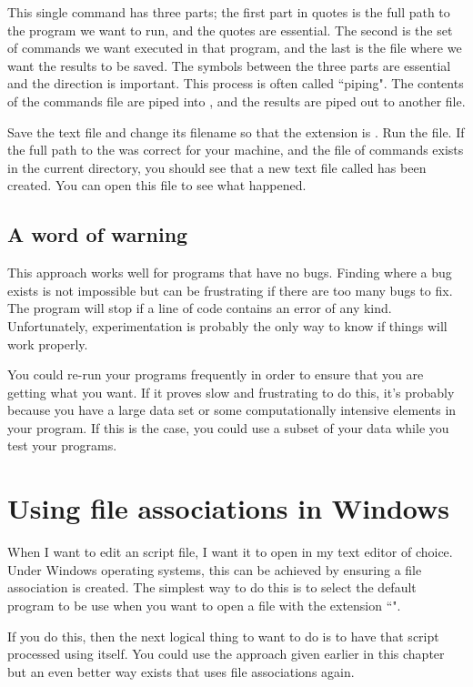 This single command has three parts; the first part in quotes is the full path to the program we want to run, and the quotes are essential. The second is the set of commands we want executed in that program, and the last is the file where we want the results to be saved. The symbols between the three parts are essential and the direction is important. This process is often called ``piping". The contents of the commands file are piped into \R{}, and the results are piped out to another file. 
 
Save the text file and change its filename so that the extension is . Run the file. If the full path to the  was correct for your machine, and the file of commands  exists in the current directory, you should see that a new text file called  has been created. You can open this file to see what happened. 
 
\subsection*{A word of warning} 
 
This approach works well for programs that have no bugs. Finding where a bug exists is not impossible but can be frustrating if there are too many bugs to fix. The program will stop if a line of code contains an error of any kind. Unfortunately, experimentation is probably the only way to know if things will work properly.  
 
You could re-run your programs frequently in order to ensure that you are getting what you want. If it proves slow and frustrating to do this, it's probably because you have a large data set or some computationally intensive elements in your program. If this is the case, you could use a subset of your data while you test your programs. 
 
 
 
\section{Using file associations in Windows} 
 
When I want to edit an \R{} script file, I want it to open in my text editor of choice. Under Windows operating systems, this can be achieved by ensuring a file association is created. The simplest way to do this is to select the default program to be use when you want to open a file with the extension ``". 
 
If you do this, then the next logical thing to want to do is to have that \R{} script processed using \R{} itself. You could use the approach given earlier in this chapter but an even better way exists that uses file associations again. 
 
